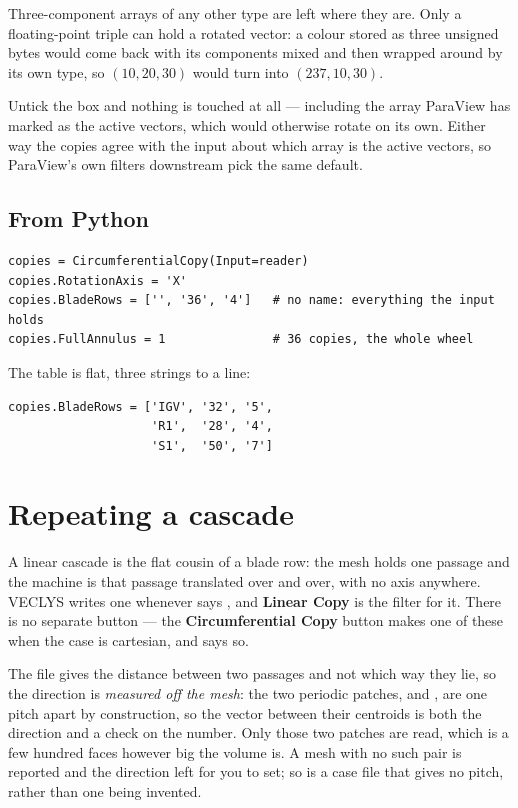 \documentclass[11pt,a4paper]{article}
\newcommand{\menu}[1]{\textbf{#1}}          %
\begin{document}
Three-component arrays of any other type are left where they are. Only a
floating-point triple can hold a rotated vector: a colour stored as three
unsigned bytes would come back with its components mixed and then wrapped around
by its own type, so $(10, 20, 30)$ would turn into $(237, 10, 30)$.

Untick the box and nothing is touched at all --- including the array ParaView has
marked as the active vectors, which  would otherwise
rotate on its own. Either way the copies agree with the input about which array
is the active vectors, so ParaView's own filters downstream pick the same
default.

\subsection{From Python}

\begin{lstlisting}[style=py]
copies = CircumferentialCopy(Input=reader)
copies.RotationAxis = 'X'
copies.BladeRows = ['', '36', '4']   # no name: everything the input holds
copies.FullAnnulus = 1               # 36 copies, the whole wheel
\end{lstlisting}

The table is flat, three strings to a line:

\begin{lstlisting}[style=py]
copies.BladeRows = ['IGV', '32', '5',
                    'R1',  '28', '4',
                    'S1',  '50', '7']
\end{lstlisting}

\section{Repeating a cascade}
\label{sec:linear}

A linear cascade is the flat cousin of a blade row: the mesh holds one passage
and the machine is that passage translated over and over, with no axis anywhere.
VECLYS writes one whenever  says , and
\menu{Linear Copy} is the filter for it. There is no separate button --- the
\menu{Circumferential Copy} button makes one of these when the case is
cartesian, and says so.

The file gives the distance between two passages and not which way they lie, so
the direction is \emph{measured off the mesh}: the two periodic patches,
 and , are one pitch apart by construction, so the vector
between their centroids is both the direction and a check on the number. Only
those two patches are read, which is a few hundred faces however big the volume
is. A mesh with no such pair is reported and the direction left for you to set;
so is a case file that gives no pitch, rather than one being invented.
\end{document}

